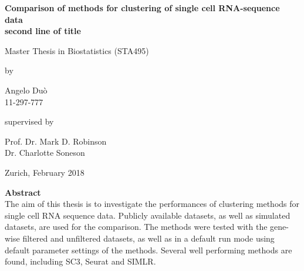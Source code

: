 \documentclass[12pt, a4paper]{article}\usepackage[]{graphicx}\usepackage[]{color}
\begin{document}

\thispagestyle{empty}
\renewcommand{\baselinestretch}{1.5}\normalfont
\begin{center}
\setlength{\parindent}{0cm}
\bf\Large%
Comparison of methods for clustering of single cell RNA-sequence data \\
second line of title
\normalfont



\hrulefill

\vspace*{4cm}

\large
Master Thesis in Biostatistics (STA495)
\vspace*{12mm}

by

\vspace*{12mm}

Angelo Du\`o\\
\small 11-297-777\\
\normalfont
\vspace*{4cm}

supervised by

\vspace*{1cm}

Prof. Dr. Mark D. Robinson\\
Dr. Charlotte Soneson

\vfill

Zurich, February 2018
\end{center}
\renewcommand\familydefault{\rmdefault}%
\renewcommand{\baselinestretch}{1.0}\rm 
\setcounter{page}{0}
\cleardoublepage
\newpage\null\thispagestyle{empty}\newpage

\newpage
\setcounter{page}{0}

{\Large\textbf{Abstract}}\\


The aim of this thesis is to investigate the performances of clustering methods for single cell RNA sequence data. Publicly available datasets, as well as simulated datasets, are used for the comparison. The methods were tested with the gene-wise filtered and unfiltered datasets, as well as in a default run mode using default parameter settings of the methods. Several well performing methods are found, including SC3, Seurat and SIMLR. 
\newpage
\tableofcontents
\setcounter{page}{0}

\end{document}
